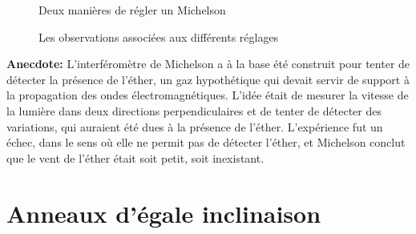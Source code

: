 \documentclass{article}
\begin{document}
\begin{figure}[htbp]
  \caption{Deux manières de régler un Michelson}
\end{figure}




\begin{figure}[h!]
  \caption{Les observations associées aux différents réglages}
\end{figure}


\newpage


\textbf{Anecdote: } L'interféromètre de Michelson a à la base été construit pour tenter de détecter la présence de l'éther, un gaz hypothétique qui devait servir de support à la propagation des ondes électromagnétiques.
L'idée était de mesurer la vitesse de la lumière dans deux directions perpendiculaires et de tenter de détecter des variations, qui auraient été dues à la présence de l'éther.
L'expérience fut un échec, dans le sens où elle ne permit pas de détecter l'éther, et Michelson conclut que le vent de l'éther était soit petit, soit inexistant.

\section{Anneaux d'égale inclinaison}
\end{document}

